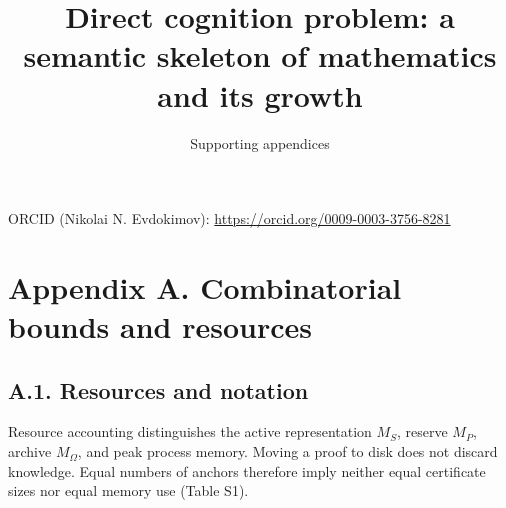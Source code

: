 \documentclass[pdflatex,sn-basic,Numbered]{sn-jnl}
\begin{document}
\title[A semantic skeleton of formal knowledge]{Direct cognition problem: a semantic skeleton of mathematics and its growth}
\subtitle{Supporting appendices}
\author[1]{ }
\author*[1]{ }
\maketitle
\noindent\small ORCID (Nikolai N. Evdokimov): \url{https://orcid.org/0009-0003-3756-8281}\par\normalsize

\section*{Appendix A. Combinatorial bounds and resources}\label{appendix-a.-combinatorial-bounds-and-resources}

\subsection*{A.1. Resources and notation}\label{a.1.-resources-and-notation}

Resource accounting distinguishes the active representation \(M_{S}\), reserve \(M_{P}\), archive \(M_{\Omega}\), and peak process memory. Moving a proof to disk does not discard knowledge. Equal numbers of anchors therefore imply neither equal certificate sizes nor equal memory use (Table S1).

\begingroup
\small
\setlength{\tabcolsep}{3pt}
\renewcommand{\arraystretch}{1.13}
\end{document}

